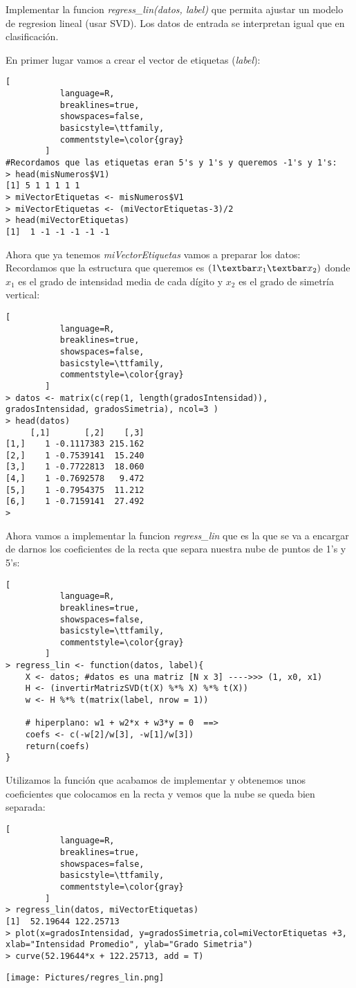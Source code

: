 \documentclass[11pt,fleqn]{book} %
\begin{document}
\begin{exercise}
Implementar la funcion \textit{regress\_lin(datos, label)} que permita ajustar un modelo de regresion lineal (usar SVD). Los datos de entrada se interpretan igual que en clasificación.
\end{exercise}
En primer lugar vamos a crear el vector de etiquetas (\textit{label}): 
\begin{lstlisting}[
           language=R,
           breaklines=true,
           showspaces=false,
           basicstyle=\ttfamily,
           commentstyle=\color{gray}
        ] 
#Recordamos que las etiquetas eran 5's y 1's y queremos -1's y 1's:   
> head(misNumeros$V1)
[1] 5 1 1 1 1 1
> miVectorEtiquetas <- misNumeros$V1 
> miVectorEtiquetas <- (miVectorEtiquetas-3)/2 
> head(miVectorEtiquetas)
[1]  1 -1 -1 -1 -1 -1
\end{lstlisting}
Ahora que ya tenemos \textit{miVectorEtiquetas} vamos a preparar los datos:\\
Recordamos que la estructura que queremos es $(1 \textbar  x_1 \textbar x_2)$ donde $x_1$ es el grado de intensidad media de cada dígito y $x_2$ es el grado de simetría vertical:
 \begin{lstlisting}[
           language=R,
           breaklines=true,
           showspaces=false,
           basicstyle=\ttfamily,
           commentstyle=\color{gray}
        ] 
> datos <- matrix(c(rep(1, length(gradosIntensidad)), gradosIntensidad, gradosSimetria), ncol=3 )
> head(datos)
     [,1]       [,2]    [,3]
[1,]    1 -0.1117383 215.162
[2,]    1 -0.7539141  15.240
[3,]    1 -0.7722813  18.060
[4,]    1 -0.7692578   9.472
[5,]    1 -0.7954375  11.212
[6,]    1 -0.7159141  27.492
> 
\end{lstlisting}
Ahora vamos a implementar la funcion \textit{regress\_lin} que es la que se va a encargar de darnos los coeficientes de la recta que separa nuestra nube de puntos de 1's y 5's:
\begin{lstlisting}[
           language=R,
           breaklines=true,
           showspaces=false,
           basicstyle=\ttfamily,
           commentstyle=\color{gray}
        ]    
> regress_lin <- function(datos, label){
    X <- datos; #datos es una matriz [N x 3] ---->>> (1, x0, x1)
    H <- (invertirMatrizSVD(t(X) %*% X) %*% t(X))
    w <- H %*% t(matrix(label, nrow = 1))
    
	# hiperplano: w1 + w2*x + w3*y = 0  ==>
    coefs <- c(-w[2]/w[3], -w[1]/w[3])
    return(coefs)
}
\end{lstlisting}
Utilizamos la función que acabamos de implementar y obtenemos unos coeficientes
que colocamos en la recta y vemos que la nube se queda bien separada:
\begin{lstlisting}[
           language=R,
           breaklines=true,
           showspaces=false,
           basicstyle=\ttfamily,
           commentstyle=\color{gray}
        ]    
> regress_lin(datos, miVectorEtiquetas)
[1]  52.19644 122.25713
> plot(x=gradosIntensidad, y=gradosSimetria,col=miVectorEtiquetas +3, xlab="Intensidad Promedio", ylab="Grado Simetria")
> curve(52.19644*x + 122.25713, add = T)
\end{lstlisting}
\texttt{[image: Pictures/regres\_lin.png]}
\end{document}
